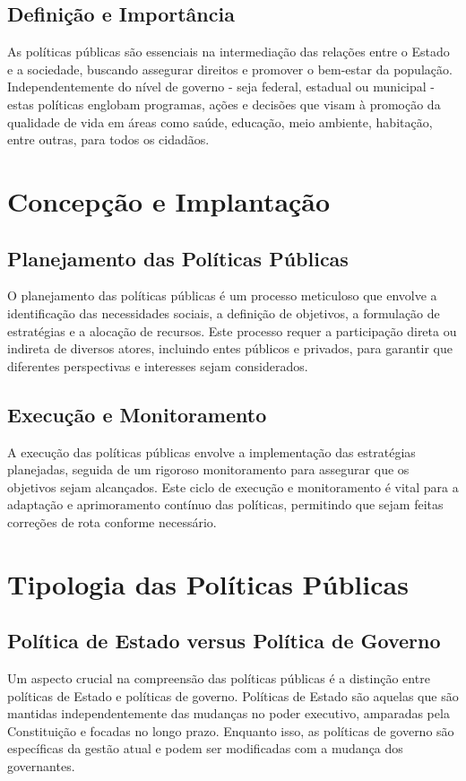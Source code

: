 \documentclass[
   article,       
   12pt,          
   oneside,       
   a4paper,       
   english,       
   brazil,        
   sumario=tradicional
   ]{abntex2}
\begin{document}
    \subsection{Definição e Importância}
        As políticas públicas são essenciais na intermediação das relações entre o Estado e a sociedade, buscando assegurar direitos e promover o bem-estar da população. Independentemente do nível de governo - seja federal, estadual ou municipal - estas políticas englobam programas, ações e decisões que visam à promoção da qualidade de vida em áreas como saúde, educação, meio ambiente, habitação, entre outras, para todos os cidadãos.

\section{Concepção e Implantação}
    \subsection{Planejamento das Políticas Públicas}
        O planejamento das políticas públicas é um processo meticuloso que envolve a identificação das necessidades sociais, a definição de objetivos, a formulação de estratégias e a alocação de recursos. Este processo requer a participação direta ou indireta de diversos atores, incluindo entes públicos e privados, para garantir que diferentes perspectivas e interesses sejam considerados.
        
    \subsection{Execução e Monitoramento}
        A execução das políticas públicas envolve a implementação das estratégias planejadas, seguida de um rigoroso monitoramento para assegurar que os objetivos sejam alcançados. Este ciclo de execução e monitoramento é vital para a adaptação e aprimoramento contínuo das políticas, permitindo que sejam feitas correções de rota conforme necessário.

\section{Tipologia das Políticas Públicas}
    \subsection{Política de Estado versus Política de Governo}
        Um aspecto crucial na compreensão das políticas públicas é a distinção entre políticas de Estado e políticas de governo. Políticas de Estado são aquelas que são mantidas independentemente das mudanças no poder executivo, amparadas pela Constituição e focadas no longo prazo. Enquanto isso, as políticas de governo são específicas da gestão atual e podem ser modificadas com a mudança dos governantes.
        
\end{document}
